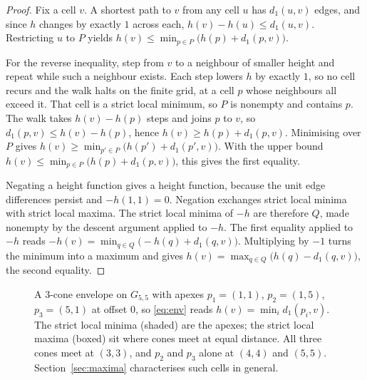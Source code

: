 \documentclass[11pt]{article}
\theoremstyle{definition}
\theoremstyle{remark}
\newcommand{\dgrid}{d_1}
\begin{document}
\begin{proof}
Fix a cell $v$. A shortest path to $v$ from any cell $u$ has $\dgrid(u,v)$
edges, and since $h$ changes by exactly $1$ across each, $h(v)-h(u)\le\dgrid(u,v)$. Restricting $u$ to $P$ yields
$h(v)\le\min_{p\in P}\big(h(p)+\dgrid(p,v)\big)$.

\medskip\noindent
For the reverse inequality, step from $v$ to a neighbour of smaller height and
repeat while such a neighbour exists. Each step lowers $h$ by exactly $1$, so no
cell recurs and the walk halts on the finite grid, at a cell $p$ whose
neighbours all exceed it. That cell is a strict local minimum, so $P$ is nonempty
and contains $p$. The walk takes $h(v)-h(p)$ steps and joins $p$ to $v$, so
$\dgrid(p,v)\le h(v)-h(p)$, hence $h(v)\ge h(p)+\dgrid(p,v)$. Minimising over $P$
gives $h(v)\ge\min_{p'\in P}\big(h(p')+\dgrid(p',v)\big)$. With the upper bound $h(v)\le\min_{p\in P}\big(h(p)+\dgrid(p,v)\big)$,
this gives the first equality.

\medskip\noindent
Negating a height function gives a height function, because the unit edge
differences persist and $-h(1,1)=0$. Negation exchanges strict local minima with
strict local maxima. The strict local minima of $-h$ are therefore $Q$, made nonempty by the descent
argument applied to $-h$. The first equality applied to $-h$
reads $-h(v)=\min_{q\in Q}\big(-h(q)+\dgrid(q,v)\big)$. Multiplying by $-1$ turns
the minimum into a maximum and gives
$h(v)=\max_{q\in Q}\big(h(q)-\dgrid(q,v)\big)$, the second equality.
\end{proof}

\begin{figure}[ht]
\centering
{}
\caption{A $3$-cone envelope on $G_{5,5}$ with apexes $p_1=(1,1)$, $p_2=(1,5)$, $p_3=(5,1)$ at offset $0$, so \eqref{eq:env} reads $h(v)=\min_i\dgrid(p_i,v)$. The strict local minima (shaded) are the apexes; the strict local maxima (boxed) sit where cones meet at equal distance. All three cones meet at $(3,3)$, and $p_2$ and $p_3$ alone at $(4,4)$ and $(5,5)$. Section~\ref{sec:maxima} characterises such cells in general.}
\label{fig:kcone-envelope}
\end{figure}
\end{document}
